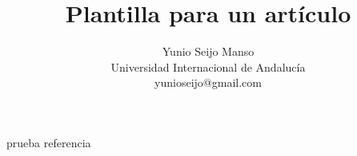 \documentclass[12pt, a4paper]{article}
\title{Plantilla para un artículo}
\author{Yunio Seijo Manso\\
  \small Universidad Internacional de Andalucía\\
  \small yunioseijo@gmail.com  
  \date{}
}
\begin{document}
\maketitle
\clearpage



prueba referencia\cite{Mitchell1997}
\tableofcontents
\clearpage


%
\setcounter{page}{4}







\end{document}
